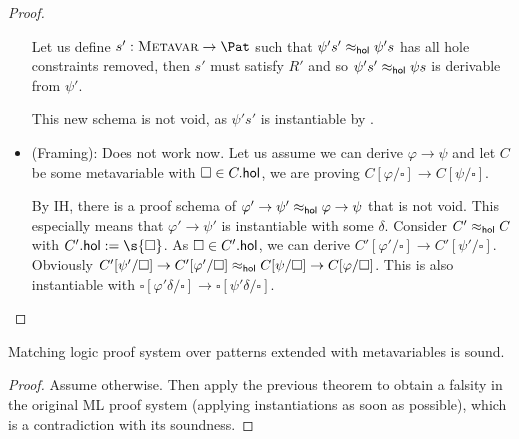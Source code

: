\documentclass{mgr}
\begin{document}
\begin{theorem*}[WIP]
\begin{proof}
\begin{itemize}
      Let us define $s' : \Metavar \to \Pat$ such that $\psi' s' \approx_{\mathsf{hol}} \psi' s$ has all hole constraints removed, then $s'$ must satisfy $R'$ and so $\psi' s' \approx_{\mathsf{hol}} \psi s$ is derivable from $\psi'$.

      This new schema is not void, as $\psi' s'$ is instantiable by .

      \item (Framing): Does not work now. Let us assume we can derive $\varphi \to \psi$ and let $C$ be some metavariable with $\square \in C.\mathsf{hol}$, we are proving $C[\varphi/\square] \to C[\psi/\square]$.

      By IH, there is a proof schema of $\varphi' \to \psi' \approx_{\mathsf{hol}} \varphi \to \psi$ that is not void.
      This especially means that $\varphi' \to \psi'$ is instantiable with some $\delta$.
      Consider $C' \approx_{\mathsf{hol}} C$ with $C'.\Hol := \s{\square}$.
      As $\square \in C'.\mathsf{hol}$, we can derive $C'[\varphi'/\square] \to C'[\psi'/\square]$.
      Obviously $C'[\psi'/\square] \to C'[\varphi'/\square] \approx_{\mathsf{hol}} C[\psi/\square] \to C[\varphi/\square]$.
      This is also instantiable with $\square[\varphi'\delta/\square] \to \square[\psi'\delta/\square]$.
    \end{itemize}
  \end{proof}
\end{theorem*}

\begin{corollary*}[WIP]
  Matching logic proof system over patterns extended with metavariables is sound.
  \begin{proof}
    Assume otherwise.
    Then apply the previous theorem to obtain a falsity in the original ML proof system (applying instantiations as soon as possible), which is a contradiction with its soundness.
  \end{proof}
\end{corollary*}
\end{document}
